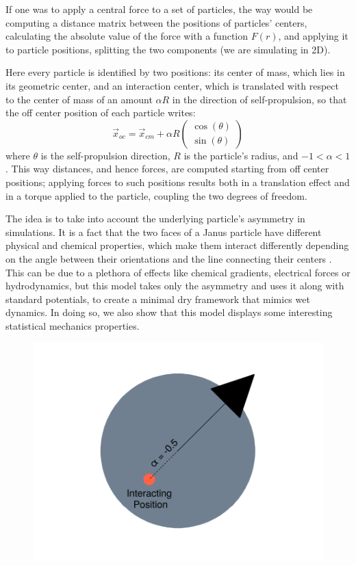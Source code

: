 \documentclass[../../master_thesis_np.tex]{subfiles}
\begin{document}
	If one was to apply a central force to a set of particles, the way would be computing a distance matrix between the positions of particles' centers, calculating the absolute value of the force with a function $F(r)$, and applying it to particle positions, splitting the two components (we are simulating in 2D).
	
	Here every particle is identified by two positions: its center of mass, which lies in its geometric center, and an interaction center, which is translated with respect to the center of mass of an amount $\alpha R$ in the direction of self-propulsion, so that the off center position of each particle writes:
	\begin{equation}
		\vec{x}_{oc} = \vec{x}_{cm} + \alpha R 
		\begin{pmatrix}
			\cos(\theta)\\
			\sin(\theta)
		\end{pmatrix}
	\end{equation}
	where $\theta$ is the self-propulsion direction, $R$ is the particle's radius, and $-1 < \alpha < 1$. This way distances, and hence forces, are computed starting from off center positions; applying forces to such positions results both in a translation effect and in a torque applied to the particle, coupling the two degrees of freedom.
	
	The idea is to take into account the underlying particle's asymmetry in simulations. It is a fact that the two faces of a Janus particle have different physical and chemical properties, which make them interact differently depending on the angle between their orientations and the line connecting their centers \cite{singh_pair_2024}. This can be due to a plethora of effects like chemical gradients, electrical forces or hydrodynamics, but this model takes only the asymmetry and uses it along with standard potentials, to create a minimal dry framework that mimics wet dynamics. In doing so, we also show that this model displays some interesting statistical mechanics properties.
	
	\begin{figure}[htp]
		\centering
		\includegraphics[width=\textwidth]{singpart_draw.png}
		\caption{}
		\label{fig:geom_model}
	\end{figure}
	
\end{document}
